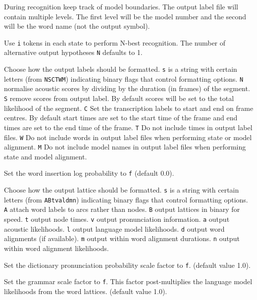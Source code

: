 \begin{optlist}
   During recognition keep track of model boundaries. The output
        label file will contain multiple levels. The first level will be the 
        model number and the second will be the word name (not the output 
        symbol).


   Use \texttt{i} tokens in each state to perform
        N-best recognition.  The number of alternative output
        hypotheses \texttt{N} defaults to 1.

   Choose how the output labels should be formatted.
        \texttt{s} is a string with certain letters (from \texttt{NSCTWM})
        indicating binary flags that control formatting options.
        \texttt{N} normalise acoustic scores by dividing by the duration
        (in frames) of the segment.
        \texttt{S} remove scores from output label.  By default 
        scores will be set to the total likelihood of the segment.
        \texttt{C} Set the transcription labels to start and end on
        frame centres. By default start times are set to the start
        time of the frame and end times are set to the end time of 
        the frame.
        \texttt{T} Do not include times in output label files.
        \texttt{W} Do not include words in output label files
        when performing state or model alignment.
        \texttt{M} Do not include model names in output label
        files when performing state and model alignment.

    Set the word insertion log probability to \texttt{f} 
        (default 0.0).

   Choose how the output lattice should be formatted.
         \texttt{s} is a string with certain letters (from \texttt{ABtvaldmn})
         indicating binary flags that control formatting options.
         \texttt{A} attach word labels to arcs rather than nodes.
         \texttt{B} output lattices in binary for speed.
         \texttt{t} output node times.
         \texttt{v} output pronunciation information.
         \texttt{a} output acoustic likelihoods.
         \texttt{l} output language model likelihoods.
         \texttt{d} output word alignments (if available).
         \texttt{m} output within word alignment durations.
         \texttt{n} output within word alignment likelihoods.

   Set the dictionary pronunciation probability scale 
        factor to \texttt{f}. (default value 1.0).

   Set the grammar scale factor to \texttt{f}.
        This factor post-multiplies the language model likelihoods
        from the word lattices.  (default value 1.0).
   

\end{optlist}
